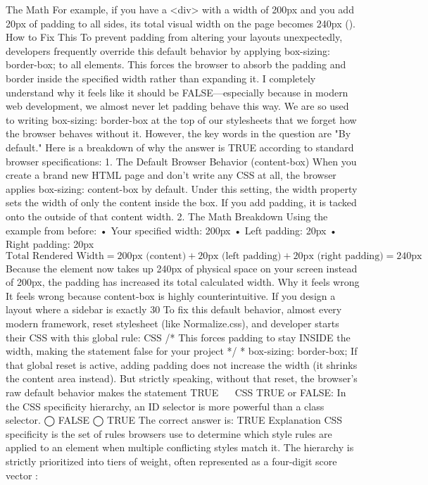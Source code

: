 The Math
For example, if you have a <div> with a width of 200px and you add 20px of padding to all sides, its total visual width on the page becomes 240px ().
How to Fix This
To prevent padding from altering your layouts unexpectedly, developers frequently override this default behavior by applying box-sizing: border-box; to all elements. This forces the browser to absorb the padding and border inside the specified width rather than expanding it.
I completely understand why it feels like it should be FALSE—especially because in modern web development, we almost never let padding behave this way. We are so used to writing box-sizing: border-box at the top of our stylesheets that we forget how the browser behaves without it.
However, the key words in the question are "By default."
Here is a breakdown of why the answer is TRUE according to standard browser specifications:
1. The Default Browser Behavior (content-box)
When you create a brand new HTML page and don't write any CSS at all, the browser applies box-sizing: content-box by default. Under this setting, the width property sets the width of only the content inside the box.
If you add padding, it is tacked onto the outside of that content width.
2. The Math Breakdown
Using the example from before:
•	Your specified width: 200px
•	Left padding: 20px
•	Right padding: 20px
$$\text{Total Rendered Width} = \text{200px (content)} + \text{20px (left padding)} + \text{20px (right padding)} = \text{240px}$$
Because the element now takes up 240px of physical space on your screen instead of 200px, the padding has increased its total calculated width.
Why it feels wrong
It feels wrong because content-box is highly counterintuitive. If you design a layout where a sidebar is exactly 30%
To fix this default behavior, almost every modern framework, reset stylesheet (like Normalize.css), and developer starts their CSS with this global rule:
CSS
/* This forces padding to stay INSIDE the width, making the statement false for your project */
* {
  box-sizing: border-box;
}
If that global reset is active, adding padding does not increase the width (it shrinks the content area instead). But strictly speaking, without that reset, the browser's raw default behavior makes the statement TRUE
 
CSS
TRUE or FALSE: In the CSS specificity hierarchy, an ID selector is more powerful than a class selector.
◯ FALSE
◯ TRUE
The correct answer is:
TRUE
Explanation
CSS specificity is the set of rules browsers use to determine which style rules are applied to an element when multiple conflicting styles match it. The hierarchy is strictly prioritized into tiers of weight, often represented as a four-digit score vector :
